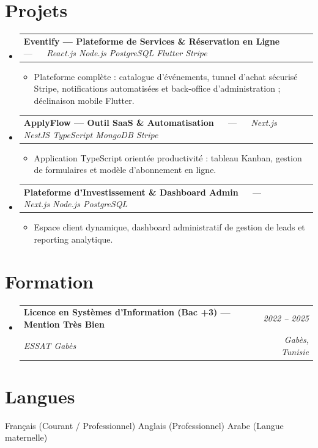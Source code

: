 \documentclass[letterpaper,9pt]{article}
\makeatletter
\newcommand{\resumeItem}[1]{\item\small{#1}}
\newcommand{\resumeSubheading}[4]{
  \vspace{-1pt}\item
  \begin{tabular*}{0.97\textwidth}[t]{l@{\extracolsep{\fill}}r}
    \textbf{#1} & \textit{\color{greytext}#2} \\
    \textit{\small\color{greytext} #3} & \textit{\small\color{greytext} #4}
  \end{tabular*}\vspace{-2pt}
}
\newcommand{\resumeProjectHeading}[2]{
  \item
  \begin{tabular*}{0.97\textwidth}{l@{\extracolsep{\fill}}r}
    \small #1 & #2
  \end{tabular*}\vspace{-1pt}
}
\newcommand{\resumeSubHeadingListStart}{\begin{itemize}[leftmargin=0.18in, label={}, itemsep=1.2pt, topsep=2.5pt, parsep=0pt]}
\newcommand{\resumeSubHeadingListEnd}{\end{itemize}\vspace{-2pt}}
\newcommand{\resumeProjectListStart}{\begin{itemize}[leftmargin=0.24in, label={}, itemsep=0.9pt, topsep=1.2pt, parsep=0pt]}
\newcommand{\resumeProjectListEnd}{\end{itemize}\vspace{-2pt}}
\makeatother
\begin{document}
\section{Projets}
\resumeSubHeadingListStart

  \resumeProjectHeading{\textbf{Eventify --- Plateforme de Services \& Réservation en Ligne} $\quad$ --- $\quad$ \emph{\color{greytext}React.js \textperiodcentered{} Node.js \textperiodcentered{} PostgreSQL \textperiodcentered{} Flutter \textperiodcentered{} Stripe}}{}
    \resumeProjectListStart
      \resumeItem{Plateforme complète : catalogue d'événements, tunnel d'achat sécurisé Stripe, notifications automatisées et back-office d'administration ; déclinaison mobile Flutter.}
    \resumeProjectListEnd

  \resumeProjectHeading{\textbf{ApplyFlow --- Outil SaaS \& Automatisation} $\quad$ --- $\quad$ \emph{\color{greytext}Next.js \textperiodcentered{} NestJS \textperiodcentered{} TypeScript \textperiodcentered{} MongoDB \textperiodcentered{} Stripe}}{}
    \resumeProjectListStart
      \resumeItem{Application TypeScript orientée productivité : tableau Kanban, gestion de formulaires et modèle d'abonnement en ligne.}
    \resumeProjectListEnd

  \resumeProjectHeading{\textbf{Plateforme d'Investissement \& Dashboard Admin} $\quad$ --- $\quad$ \emph{\color{greytext}Next.js \textperiodcentered{} Node.js \textperiodcentered{} PostgreSQL}}{}
    \resumeProjectListStart
      \resumeItem{Espace client dynamique, dashboard administratif de gestion de leads et reporting analytique.}
    \resumeProjectListEnd

\resumeSubHeadingListEnd\vspace{-3pt}

\section{Formation}
\resumeSubHeadingListStart
  \resumeSubheading{Licence en Systèmes d'Information (Bac +3) --- Mention Très Bien}{2022 -- 2025}{ESSAT Gabès}{Gabès, Tunisie}
\resumeSubHeadingListEnd\vspace{-1pt}

\section{Langues}
\begin{itemize}[leftmargin=0.18in, label={}, topsep=2pt, itemsep=1pt, parsep=0pt]
\footnotesize{
  \item Français (Courant / Professionnel) \textperiodcentered{} Anglais (Professionnel) \textperiodcentered{} Arabe (Langue maternelle)
}
\end{itemize}
\end{document}
